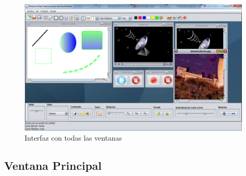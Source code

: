 \begin{figure}[H]
  \centering
    \includegraphics[scale=0.40]{images/interfaz_con_ventanas}
  \caption{Interfaz con todas las ventanas}
  \label{Interfaz con todas las ventanas}
\end{figure}
\subsection{Ventana Principal}

